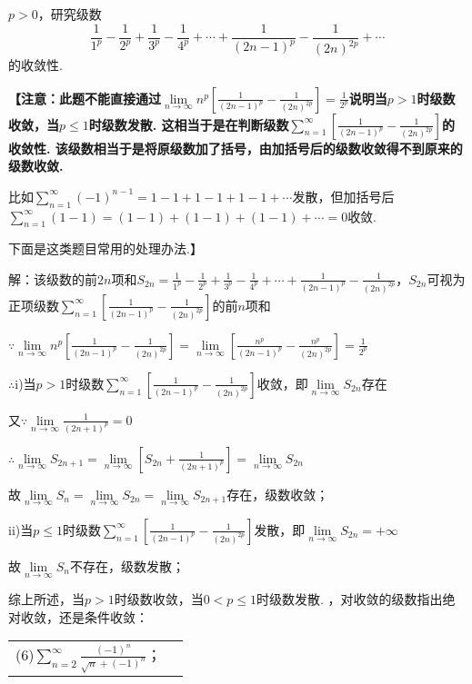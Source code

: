 \documentclass[12pt,UTF8]{ctexart}
\begin{document}
\begin{enumerate}
$p>0$，研究级数
\[
\frac1{1^p}-\frac1{2^p}+\frac1{3^p}-\frac1{4^p}+\cdots+\frac1{(2n-1)^p}-\frac1{(2n)^{2p}}+\cdots
\]
的收敛性.

{\bf【注意：此题不能直接通过$\lim\limits_{n\rightarrow\infty}n^p[\frac1{(2n-1)^p}-\frac1{(2n)^{2p}}]=\frac1{2^p}$说明当$p>1$时级数收敛，当$p\leq1$时级数发散. 这相当于是在判断级数$\sum_{n=1}^\infty[\frac1{(2n-1)^p}-\frac1{(2n)^{2p}}]$的收敛性. 该级数相当于是将原级数加了括号，由加括号后的级数收敛得不到原来的级数收敛.

比如$\sum_{n=1}^\infty(-1)^{n-1}=1-1+1-1+1-1+\cdots$发散，但加括号后$\sum_{n=1}^\infty(1-1)=(1-1)+(1-1)+(1-1)+\cdots=0$收敛.

下面是这类题目常用的处理办法.】}

解：该级数的前$2n$项和$S_{2n}=\frac1{1^p}-\frac1{2^p}+\frac1{3^p}-\frac1{4^p}+\cdots+\frac1{(2n-1)^p}-\frac1{(2n)^{2p}}$，$S_{2n}$可视为正项级数$\sum_{n=1}^\infty[\frac1{(2n-1)^p}-\frac1{(2n)^{2p}}]$的前$n$项和

$\because\lim\limits_{n\rightarrow\infty}n^p[\frac1{(2n-1)^p}-\frac1{(2n)^{2p}}]=\lim\limits_{n\rightarrow\infty}[\frac{n^p}{(2n-1)^p}-\frac{n^p}{(2n)^{2p}}]=\frac1{2^p}$

$\therefore$i)当$p>1$时级数$\sum_{n=1}^\infty[\frac1{(2n-1)^p}-\frac1{(2n)^{2p}}]$收敛，即$\lim\limits_{n\rightarrow\infty}S_{2n}$存在

又$\because\lim\limits_{n\rightarrow\infty}\frac1{(2n+1)^p}=0$

$\therefore\lim\limits_{n\rightarrow\infty}S_{2n+1}=\lim\limits_{n\rightarrow\infty}[S_{2n}+\frac1{(2n+1)^p}]=\lim\limits_{n\rightarrow\infty}S_{2n}$

故$\lim\limits_{n\rightarrow\infty}S_n=\lim\limits_{n\rightarrow\infty}S_{2n}=\lim\limits_{n\rightarrow\infty}S_{2n+1}$存在，级数收敛；

ii)当$p\leq1$时级数$\sum_{n=1}^\infty[\frac1{(2n-1)^p}-\frac1{(2n)^{2p}}]$发散，即$\lim\limits_{n\rightarrow\infty}S_{2n}=+\infty$
%
%
%

故$\lim\limits_{n\rightarrow\infty}S_n$不存在，级数发散；

综上所述，当$p>1$时级数收敛，当$0<p\leq1$时级数发散.
，对收敛的级数指出绝对收敛，还是条件收敛：
\newline
\begin{tabular}{ll}
(6)$\sum_{n=2}^\infty\frac{(-1)^n}{\sqrt n+(-1)^n}$；
\end{tabular}


\end{enumerate}
\end{document}

